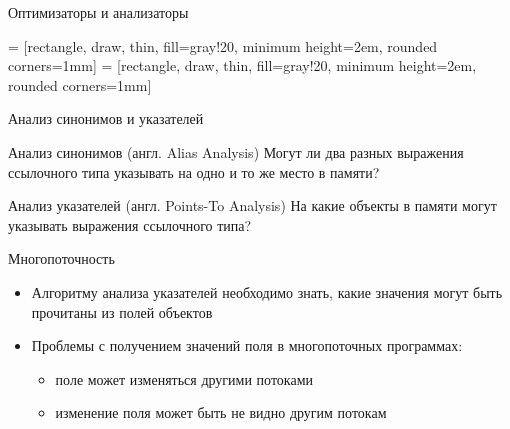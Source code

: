 \documentclass[usenames,dvipsnames,pdftex,unicode]{beamer}
\newcommand{\eng}[1]{{\English#1}}
\begin{document}
\begin{frame}{Оптимизаторы и анализаторы}

   = [rectangle, draw, thin, fill=gray!20,%
                         minimum height=2em, rounded corners=1mm]
   =  [rectangle, draw, thin, fill=gray!20,%
                         minimum height=2em, rounded corners=1mm]

  \begin{figure}
  \end{figure}

\end{frame}

\begin{frame}{Анализ синонимов и указателей}

  \begin{block}{Анализ синонимов (англ. \eng{Alias Analysis})}
    Могут ли два разных выражения ссылочного типа указывать на одно и то же
    место в памяти?
  \end{block}

  \begin{block}{Анализ указателей (англ. \eng{Points-To Analysis})}
    На какие объекты в памяти могут указывать выражения ссылочного типа?
  \end{block}

\end{frame}

\begin{frame}{Многопоточность}

  \begin{itemize}
    \item<1-> Алгоритму анализа указателей необходимо знать, какие значения
          могут быть прочитаны из полей объектов
    \item<1-> Проблемы с получением значений поля в многопоточных программах:
          \begin{itemize}
            \item<2-> поле может изменяться другими потоками
            \item<3-> изменение поля может быть не видно другим потокам
          \end{itemize}
  \end{itemize}

\end{frame}
\end{document}
